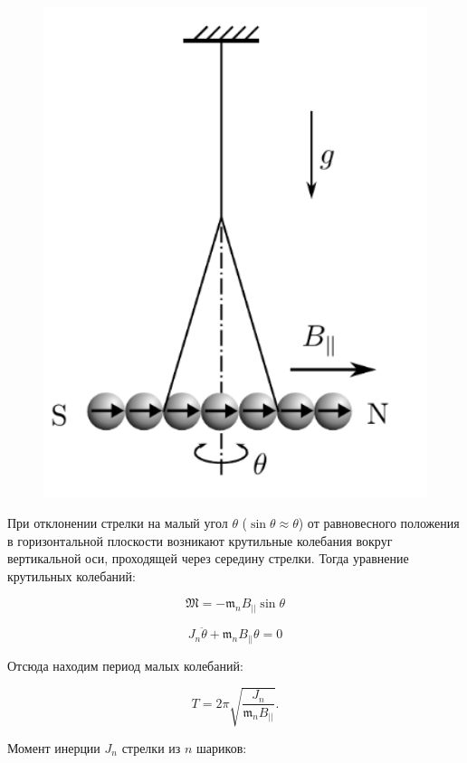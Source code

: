 \documentclass[a4paper,12pt]{article} %
\begin{document}
\begin{figure}
\begin{center}
    \includegraphics[width=1\textwidth]{3.1.3_3.png}
\end{center}
\end{figure}

\hfill \break При отклонении стрелки на малый угол $\theta$ ($\sin{\theta} \approx \theta$) от равновесного положения в горизонтальной плоскости возникают крутильные колебания вокруг вертикальной оси, проходящей через середину стрелки. Тогда уравнение крутильных колебаний:

$$
\mathfrak{M} = -\mathfrak{m}_{n}\textit{B}_{||}\sin{\theta}
$$

$$
J_{n}\ddot{\theta} + \mathfrak{m}_{n}B_{||}\theta = 0
$$

\hfill \break Отсюда находим период малых колебаний:

$$
T = 2\pi\sqrt{\frac{J_{n}}{\mathfrak{m}_{n}B_{||}}}.
$$

\hfill \break Момент инерции $J_{n}$ стрелки из $n$ шариков:
\end{document}
